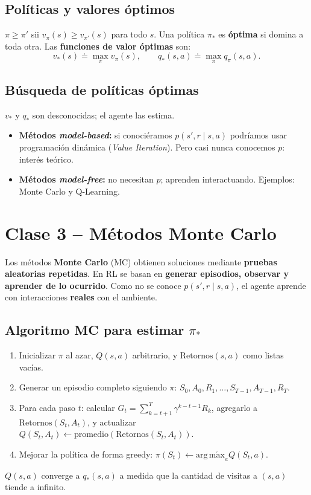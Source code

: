 \documentclass[11pt, a4paper]{article}
\newcommand{\argmax}{\operatorname*{arg\,m\acute{a}x}}
\begin{document}
\subsection{Pol\'iticas y valores \'optimos}
$\pi \geq \pi'$ sii $v_\pi(s) \geq v_{\pi'}(s)$ para todo $s$. Una pol\'itica $\pi_*$ es \textbf{\'optima} si domina a toda otra. Las \textbf{funciones de valor \'optimas} son:
\[
    v_*(s) \doteq \max_\pi v_\pi(s), \qquad q_*(s,a) \doteq \max_\pi q_\pi(s,a).
\]

\subsection{B\'usqueda de pol\'iticas \'optimas}
$v_*$ y $q_*$ son desconocidas; el agente las estima.
\begin{itemize}[nosep]
    \item \textbf{M\'etodos \emph{model-based}:} si conoci\'eramos $p(s', r \mid s, a)$ podr\'iamos usar programaci\'on din\'amica (\emph{Value Iteration}). Pero casi nunca conocemos $p$: interés te\'orico.
    \item \textbf{M\'etodos \emph{model-free}:} no necesitan $p$; aprenden interactuando. Ejemplos: Monte Carlo y Q-Learning.
\end{itemize}

\section{Clase 3 -- M\'etodos Monte Carlo}

Los m\'etodos \textbf{Monte Carlo} (MC) obtienen soluciones mediante \textbf{pruebas aleatorias repetidas}. En RL se basan en \textbf{generar episodios, observar y aprender de lo ocurrido}. Como no se conoce $p(s', r \mid s, a)$, el agente aprende con interacciones \textbf{reales} con el ambiente.

\subsection{Algoritmo MC para estimar $\pi_*$}
\begin{enumerate}[nosep]
    \item Inicializar $\pi$ al azar, $Q(s,a)$ arbitrario, y $\text{Retornos}(s,a)$ como listas vac\'ias.
    \item Generar un episodio completo siguiendo $\pi$: $S_0, A_0, R_1, \dots, S_{T-1}, A_{T-1}, R_T$.
    \item Para cada paso $t$: calcular $G_t = \sum_{k=t+1}^{T} \gamma^{k-t-1} R_k$, agregarlo a $\text{Retornos}(S_t, A_t)$, y actualizar $Q(S_t, A_t) \leftarrow \text{promedio}(\text{Retornos}(S_t, A_t))$.
    \item Mejorar la pol\'itica de forma greedy: $\pi(S_t) \leftarrow \argmax_a Q(S_t, a)$.
\end{enumerate}
$Q(s,a)$ converge a $q_*(s,a)$ a medida que la cantidad de visitas a $(s,a)$ tiende a infinito.
\end{document}
